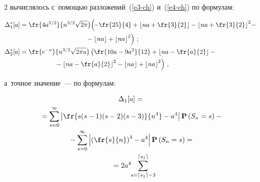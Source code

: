 \begin{multicols}{2}
 вычислялось с~помощью разложений~(\ref{e3-ch}) и~(\ref{e4-ch}) по формулам:


 \begin{align*}


 \Delta_1^*[a]&=\fr{4a^{5/2}}{n^{3/2} \sqrt{2\pi}}\!


 \left(\!-\fr{25}{4} +\left\lfloor na+\fr{3}{2} \right\rfloor-


 \left\lfloor na+\fr{3}{2} \right\rfloor^2\!


 -{}\right.\\


&\hspace*{35mm}\left. {}-\left\lfloor na \right\rfloor+


 \left\lfloor na \right\rfloor^2 \right)\,;


 \\


 \Delta_2^*[a]&=\fr{e^{-a}}{n^{3/2} \sqrt{2 \pi a}}


 \left( \fr{10a-9a^2}{12}+


 \left \lfloor na-\fr{a}{2} \right\rfloor -{}\right.\\


 &\left.\hspace*{18mm}{}-


 \left\lfloor na-\fr{a}{2} \right\rfloor^2-


 \left\lfloor na\right\rfloor


  +\left\lfloor na\right\rfloor^2


 \right)\,,


 \end{align*}


 а~точное значение~--- по формулам:


 \begin{multline*}


 \Delta_1[a]  ={}\\


 {}=\sum\limits_{s=0}^\infty \left|\fr{s(s-1)(s-2)(s-3)}{n^4}-a^4 \right|


 \mathbf{P}\left(S_n=s\right)-{}\\


 {} -\sum\limits_{s=0}^\infty \left|\left(\fr{s}{n}\right)^4-a^4 \right|


 \mathbf{P}\left(S_n=s\right)


 ={}\\


 {}=2a^4\hspace*{-1mm}\sum\limits_{s=\lceil s_1 \rceil-3}^{\lceil s_1 \rceil} \hspace*{-2mm}



\end{multline*}
\end{multicols}
